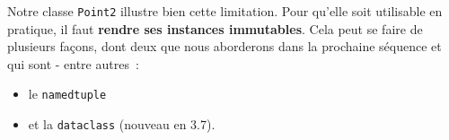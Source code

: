     Notre classe \texttt{Point2} illustre bien cette limitation. Pour
qu'elle soit utilisable en pratique, il faut \textbf{rendre ses
instances immutables}. Cela peut se faire de plusieurs façons, dont deux
que nous aborderons dans la prochaine séquence et qui sont - entre
autres~:

\begin{itemize}
\tightlist
\item
  le \texttt{namedtuple}
\item
  et la \texttt{dataclass} (nouveau en 3.7).
\end{itemize}


    
    
    
